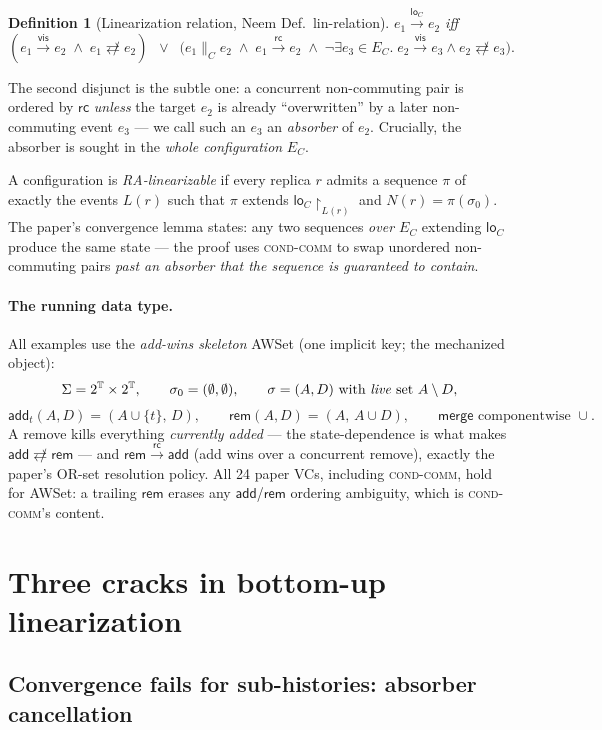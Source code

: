 \documentclass[11pt]{article}
\newtheorem{definition}[theorem]{Definition}
\newcommand{\vis}{\xrightarrow{\mathsf{vis}}}
\newcommand{\rc}{\xrightarrow{\mathsf{rc}}}
\newcommand{\loC}{\xrightarrow{\mathsf{lo}_{C}}}
\newcommand{\ncomm}{\not\rightleftarrows}
\newcommand{\add}{\mathsf{add}}
\newcommand{\rem}{\mathsf{rem}}
\newcommand{\Merge}{\mathsf{merge}}
\newcommand{\Sinit}{\sigma_0}
\begin{document}
\begin{definition}[Linearization relation, {Neem Def.~lin-relation}]
\label{def:loC}
$e_1 \loC e_2$ iff
\[
(e_1 \vis e_2 \;\wedge\; e_1 \ncomm e_2)
\;\;\vee\;\;
\bigl(e_1 \parallel_C e_2 \;\wedge\; e_1 \rc e_2 \;\wedge\;
\neg\exists e_3 \in E_C.\; e_2 \vis e_3 \wedge e_2 \ncomm e_3\bigr).
\]
\end{definition}
The second disjunct is the subtle one: a concurrent non-commuting pair is
ordered by $\mathsf{rc}$ \emph{unless} the target $e_2$ is already
``overwritten'' by a later non-commuting event $e_3$ --- we call such an
$e_3$ an \emph{absorber} of $e_2$. Crucially, the absorber is sought in
the \emph{whole configuration} $E_C$.

A configuration is \emph{RA-linearizable} if every replica $r$ admits a
sequence $\pi$ of exactly the events $L(r)$ such that $\pi$ extends
$\mathsf{lo}_C\restriction_{L(r)}$ and $N(r) = \pi(\Sinit)$. The paper's
convergence lemma states: any two sequences \emph{over $E_C$} extending
$\mathsf{lo}_C$ produce the same state --- the proof uses
\textsc{cond-comm} to swap unordered non-commuting pairs \emph{past an
absorber that the sequence is guaranteed to contain}.

\paragraph{The running data type.}
All examples use the \emph{add-wins skeleton} \textsf{AWSet} (one implicit
key; the mechanized object):
\[
\Sigma = 2^{\mathbb{T}} \times 2^{\mathbb{T}}, \qquad
\Sinit = (\emptyset,\emptyset), \qquad
\sigma = (A, D) \text{ with \emph{live} set } A \setminus D,
\]
\[
\add_t(A,D) = (A \cup \{t\},\, D), \qquad
\rem(A,D) = (A,\, A \cup D), \qquad
\Merge \text{ componentwise } \cup .
\]
A remove kills everything \emph{currently added} --- the state-dependence
is what makes $\add \ncomm \rem$ --- and $\rem \rc \add$ (add wins over a
concurrent remove), exactly the paper's OR-set resolution policy. All 24
paper VCs, including \textsc{cond-comm}, hold for \textsf{AWSet}: a
trailing $\rem$ erases any $\add$/$\rem$ ordering ambiguity, which is
\textsc{cond-comm}'s content.

\section{Three cracks in bottom-up linearization}
\label{sec:cracks}

\subsection{Convergence fails for sub-histories: absorber cancellation}
\end{document}
